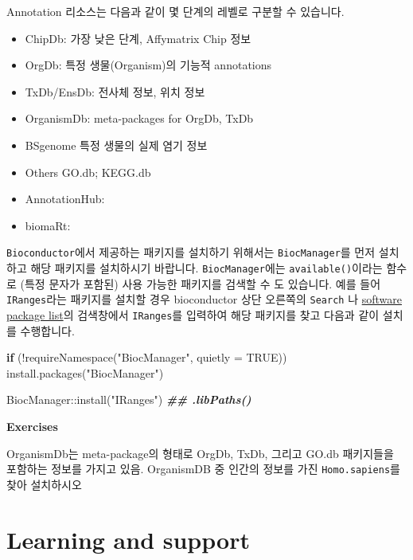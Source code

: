 \documentclass[
]{book}
\newenvironment{Shaded}{\begin{snugshade}}{\end{snugshade}}
\newcommand{\AttributeTok}[1]{\textcolor[rgb]{0.77,0.63,0.00}{#1}}
\newcommand{\ConstantTok}[1]{\textcolor[rgb]{0.00,0.00,0.00}{#1}}
\newcommand{\ControlFlowTok}[1]{\textcolor[rgb]{0.13,0.29,0.53}{\textbf{#1}}}
\newcommand{\DocumentationTok}[1]{\textcolor[rgb]{0.56,0.35,0.01}{\textbf{\textit{#1}}}}
\newcommand{\FunctionTok}[1]{\textcolor[rgb]{0.00,0.00,0.00}{#1}}
\newcommand{\NormalTok}[1]{#1}
\newcommand{\SpecialCharTok}[1]{\textcolor[rgb]{0.00,0.00,0.00}{#1}}
\newcommand{\StringTok}[1]{\textcolor[rgb]{0.31,0.60,0.02}{#1}}
\providecommand{\tightlist}{%
  \setlength{\itemsep}{0pt}\setlength{\parskip}{0pt}}
\begin{document}
Annotation 리소스는 다음과 같이 몇 단계의 레벨로 구분할 수 있습니다.

\begin{itemize}
\tightlist
\item
  ChipDb: 가장 낮은 단계, Affymatrix Chip 정보
\item
  OrgDb: 특정 생물(Organism)의 기능적 annotations
\item
  TxDb/EnsDb: 전사체 정보, 위치 정보
\item
  OrganismDb: meta-packages for OrgDb, TxDb
\item
  BSgenome 특정 생물의 실제 염기 정보
\item
  Others GO.db; KEGG.db
\item
  AnnotationHub:
\item
  biomaRt:
\end{itemize}

\texttt{Bioconductor}에서 제공하는 패키지를 설치하기 위해서는 \texttt{BiocManager}를 먼저 설치하고 해당 패키지를 설치하시기 바랍니다. \texttt{BiocManager}에는 \texttt{available()}이라는 함수로 (특정 문자가 포함된) 사용 가능한 패키지를 검색할 수 도 있습니다. 예를 들어 \texttt{IRanges}라는 패키지를 설치할 경우 bioconductor 상단 오른쪽의 \texttt{Search} 나 \href{https://www.bioconductor.org/packages/release/BiocViews.html\#___Software}{software package list}의 검색창에서 \texttt{IRanges}를 입력하여 해당 패키지를 찾고 다음과 같이 설치를 수행합니다.

\begin{Shaded}
\begin{Highlighting}[]
\ControlFlowTok{if}\NormalTok{ (}\SpecialCharTok{!}\FunctionTok{requireNamespace}\NormalTok{(}\StringTok{"BiocManager"}\NormalTok{, }\AttributeTok{quietly =} \ConstantTok{TRUE}\NormalTok{))}
    \FunctionTok{install.packages}\NormalTok{(}\StringTok{"BiocManager"}\NormalTok{)}

\NormalTok{BiocManager}\SpecialCharTok{::}\FunctionTok{install}\NormalTok{(}\StringTok{"IRanges"}\NormalTok{)}
\DocumentationTok{\#\# .libPaths()}
\end{Highlighting}
\end{Shaded}

\textbf{Exercises }

OrganismDb는 meta-package의 형태로 OrgDb, TxDb, 그리고 GO.db 패키지들을 포함하는 정보를 가지고 있음. OrganismDB 중 인간의 정보를 가진 \texttt{Homo.sapiens}를 찾아 설치하시오

\hypertarget{learning-and-support}{%
\section{Learning and support}\label{learning-and-support}}
\end{document}
